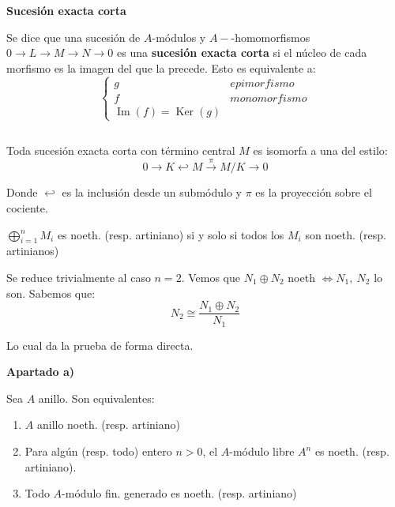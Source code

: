 \documentclass[openany]{book}
\begin{document}
\begin{definition}
    \textbf{Sucesión exacta corta}

    Se dice que una sucesión de $ A$-módulos y $ A-$-homomorfismos $ 0\to L \to M \to N\to 0$ es una \textbf{sucesión exacta corta} si el núcleo de cada morfismo es la imagen del que la precede. Esto es equivalente a:
    $$ \left\{
    \begin{array}{ll}
        g & epimorfismo\\ 
        f & monomorfismo\\ 
        \operatorname{Im}(f) = \operatorname{Ker}(g)
    \end{array}
    \right. $$
\end{definition}

\begin{exercise}
    $ $
    
    Toda sucesión exacta corta con término central $ M$ es isomorfa a una del estilo:
    $$ 0 \to K \hookleftarrow M \xrightarrow{\pi} M/K \to 0$$

    Donde $ \hookleftarrow$ es la inclusión desde un submódulo y $ \pi$ es la proyección sobre el cociente.
\end{exercise}

\setcounter{propositiont}{26}

\begin{corollary}
    $ \bigoplus\limits_{i=1}^{n} M_i$ es noeth. (resp. artiniano) si y solo si todos los $ M_i$ son noeth. (resp. artinianos)

\end{corollary}

\begin{demonstration}

    Se reduce trivialmente al caso $ n = 2$. Vemos que $ N_1 \oplus N_2 $ noeth $ \iff N_1,\ N_2$ lo son. Sabemos que:
    $$ N_2 \cong \dfrac{N_1 \oplus N_2}{N_1} $$

    Lo cual da la prueba de forma directa.
\end{demonstration}

\begin{corollary}
    \textbf{Apartado a)}

    Sea $ A$ anillo. Son equivalentes:
    \begin{enumerate}
        \item $ A$ anillo noeth. (resp. artiniano)
        \item Para algún (resp. todo) entero $ n>0$, el $ A$-módulo libre $ A^{n}$ es noeth. (resp. artiniano).
        \item Todo $ A$-módulo fin. generado es noeth. (resp. artiniano)
    \end{enumerate}
\end{corollary}
\end{document}
